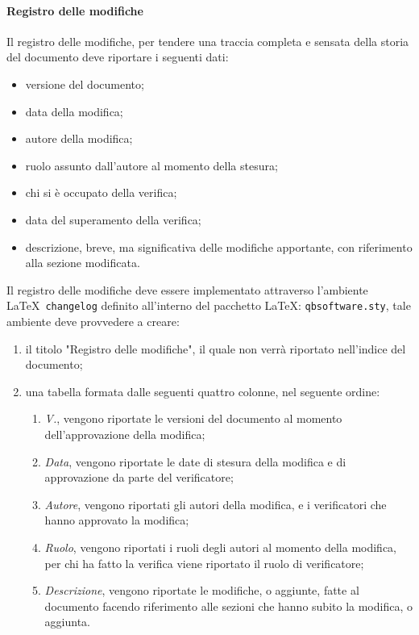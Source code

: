         \paragraph{Registro delle modifiche} \label{sec:doc_changelog}
            Il registro delle modifiche, per tendere una traccia completa e sensata della storia del documento deve riportare i seguenti dati:
            \begin{itemize}
                \item versione del documento;
                \item data della modifica;
                \item autore della modifica;
                \item ruolo assunto dall'autore al momento della stesura;
                \item chi si è occupato della verifica;
                \item data del superamento della verifica;
                \item descrizione, breve, ma significativa delle modifiche apportante, con riferimento alla sezione modificata.
            \end{itemize}
            Il registro delle modifiche deve essere implementato attraverso l'ambiente \LaTeX\ \verb|changelog| definito all'interno del pacchetto \LaTeX: \verb|qbsoftware.sty|, tale ambiente deve provvedere a creare:
            \begin{enumerate}
                \item il titolo "Registro delle modifiche", il quale non verrà riportato nell'indice del documento;
                \item una tabella formata dalle seguenti quattro colonne, nel seguente ordine:
                \begin{enumerate}
                    \item \emph{V.}, vengono riportate le versioni del documento al momento dell'approvazione della modifica;
                    \item \emph{Data}, vengono riportate le date di stesura della modifica e di approvazione da parte del verificatore;
                    \item \emph{Autore}, vengono riportati gli autori della modifica, e i verificatori che hanno approvato la modifica;
                    \item \emph{Ruolo}, vengono riportati i ruoli degli autori al momento della modifica, per chi ha fatto la verifica viene riportato il ruolo di verificatore;
                    \item \emph{Descrizione}, vengono riportate le modifiche, o aggiunte, fatte al documento facendo riferimento alle sezioni che hanno subito la modifica, o aggiunta. 
                \end{enumerate}
            \end{enumerate}
